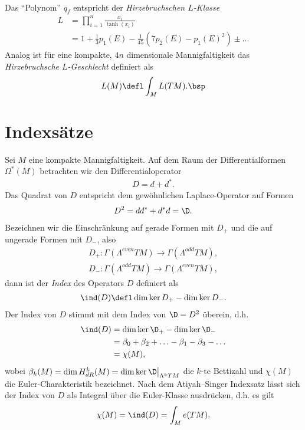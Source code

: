 \documentclass[%
	paper=a5,%
	fleqn,%
	DIV=18,%
	BCOR=0mm,
	fontsize=11pt,
	titlepage=false,%
	bibliography=totoc,
	DIV=18,%
	twoside=true,
	pdftitle=Riemannsche Geometrie,
	pdfauthor=Uwe Semmelmann,
	numbers=noendperiod]%
	{scrbook}
\begin{document}
\begin{ex}
\begin{exenum}
\begin{align*}
\end{align*}
Das ``Polynom'' $q_{f}$ entspricht der \emph{Hirzebruchschen $L$-Klasse}
\begin{align*}
L &= \prod_{i=1}^n \frac{x_{i}}{\tanh(x_{i})}\\
&= 1 + \frac{1}{3}p_{1}(E) - \frac{1}{45}\left(7p_{2}(E) - p_{1}(E)^2\right) \pm \ldots
\end{align*}
Analog ist für eine kompakte, $4n$ dimensionale Mannigfaltigkeit das \emph{Hirzebruchsche $L$-Geschlecht} definiert als
\begin{align*}
L(M) \defl \int_{M} L(TM).\bsp
\end{align*}
\end{exenum}
\end{ex}

\section{Indexsätze}

Sei $M$ eine kompakte Mannigfaltigkeit. Auf dem Raum der Differentialformen $\Omega^*(M)$ betrachten wir den Differentialoperator
\begin{align*}
D = d + d^*.
\end{align*}
Das Quadrat von $D$ entspricht dem gewöhnlichen Laplace-Operator auf Formen
\begin{align*}
D^2 = dd^*+d^*d = \D.
\end{align*}
Bezeichnen wir die Einschränkung auf gerade Formen mit $D_{+}$ und die auf ungerade Formen mit $D_{-}$, also
\begin{align*}
D_{+} : \Gamma(\Lambda^{even}TM)\to \Gamma(\Lambda^{odd}TM),\\
D_{-} : \Gamma(\Lambda^{odd}TM)\to \Gamma(\Lambda^{even}TM),
\end{align*}
dann ist der \emph{Index} des Operators $D$ definiert als
\begin{align*}
\ind(D)\defl \dim \ker D_{+} - \dim \ker D_{-}.
\end{align*}
Der Index von $D$ stimmt mit dem Index von $\D=D^2$ überein, d.h.
\begin{align*}
\ind(D)
& = \dim \ker \D_{+} - \dim \ker \D_{-}\\ & =
\beta_{0} + \beta_{2} + \ldots - \beta_{1}-\beta_{3}-\ldots\\
&=\chi(M),
\end{align*}
wobei $\beta_{k}(M) = \dim H^k_{dR}(M) = \dim \ker \D\big|_{\Lambda^k TM}$ die $k$-te Bettizahl und $\chi(M)$ die Euler-Charakteristik bezeichnet.
Nach dem Atiyah–Singer Indexsatz lässt sich der Index von $D$ als Integral über die Euler-Klasse ausdrücken, d.h. es gilt
\begin{align*}
\chi(M) = \ind(D) = \int_{M} e(TM).
\end{align*}
\end{document}
